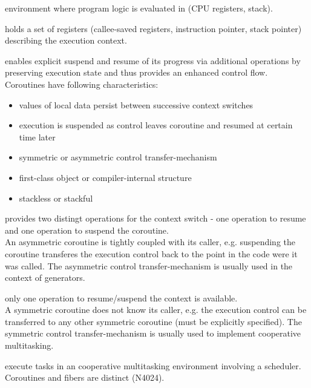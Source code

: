 
environment where program logic is evaluated in (CPU registers, stack).

holds a set of registers (callee-saved registers, instruction pointer, stack
pointer) describing the execution context.

enables explicit suspend and resume of its progress via additional operations by
preserving execution state and thus provides an enhanced control flow.
Coroutines have following characteristics\cite{N3985}:
\begin{itemize}
    \item values of local data persist between successive context switches
    \item execution is suspended as control leaves coroutine and resumed at
          certain time later
    \item symmetric or asymmetric control transfer-mechanism
    \item first-class object or compiler-internal structure
    \item stackless or stackful
\end{itemize}

provides two distingt operations for the context switch - one operation to
resume and one operation to suspend the coroutine.\\
An asymmetric coroutine is tightly coupled with its caller, e.g. suspending the
coroutine transferes the execution control back to the point in the code were it
was called. The asymmetric control transfer-mechanism is usually used in the
context of generators.

only one operation to resume/suspend the context is available.\\
A symmetric coroutine does not know its caller, e.g. the execution control can
be transferred to any other symmetric coroutine (must be explicitly specified).
The symmetric control transfer-mechanism is usually used to implement
cooperative multitasking.

execute tasks in an cooperative multitasking environment involving a
scheduler. Coroutines and fibers are distinct (N4024\cite{N4024}).

